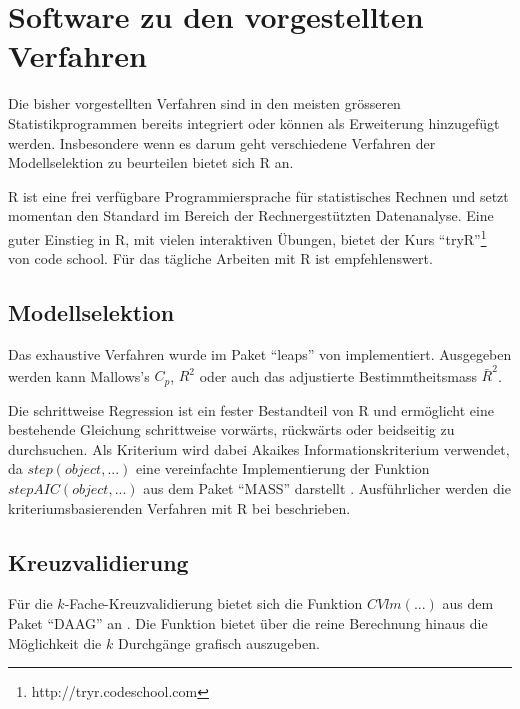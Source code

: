 \section{Software zu den vorgestellten Verfahren}
Die bisher vorgestellten Verfahren sind in den meisten grösseren Statistikprogrammen bereits integriert oder können als Erweiterung hinzugefügt werden.
Insbesondere wenn es darum geht verschiedene Verfahren der Modellselektion zu beurteilen bietet sich R an.

R ist eine frei verfügbare Programmiersprache für statistisches Rechnen und setzt momentan den Standard im Bereich der Rechnergestützten Datenanalyse. 
Eine guter Einstieg in R, mit vielen interaktiven Übungen, bietet der Kurs ``tryR''\footnote{http://tryr.codeschool.com} von code school.
Für das tägliche Arbeiten mit R ist   empfehlenswert.

\subsection{Modellselektion}
Das exhaustive Verfahren wurde im Paket ``leaps'' von  implementiert. 
Ausgegeben werden kann Mallows's $C_p$, $R^2$ oder auch das adjustierte Bestimmtheitsmass $\bar R^2$.

Die schrittweise Regression ist ein fester Bestandteil von R \cite{R:core} und ermöglicht eine bestehende Gleichung schrittweise vorwärts, rückwärts oder beidseitig zu durchsuchen.
Als Kriterium wird dabei Akaikes Informationskriterium verwendet, da $step(object, ...)$ eine vereinfachte Implementierung der Funktion $stepAIC(object, ...)$  aus dem Paket ``MASS'' darstellt \cite{R:MASS}. 
Ausführlicher werden die kriteriumsbasierenden Verfahren mit R bei  beschrieben.

\subsection{Kreuzvalidierung}
Für die $k$-Fache-Kreuzvalidierung bietet sich die Funktion $CVlm(...)$ aus dem Paket ``DAAG'' an \cite{R:DAAG}. 
Die Funktion bietet über die reine Berechnung hinaus die Möglichkeit die $k$ Durchgänge grafisch auszugeben.